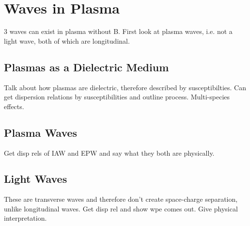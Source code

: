 \section{Waves in Plasma}%
\label{sec:theory_waves_plasmas}

3 waves can exist in plasma without B.
First look at plasma waves, i.e. not a light wave, both of which are longitudinal.

\subsection{Plasmas as a Dielectric Medium}%
\label{sec:theory_dielectric}

Talk about how plasmas are dielectric, therefore described by susceptibilties.
Can get dispersion relations by susceptibilities and outline process.
Multi-species effects.

\subsection{Plasma Waves}%
\label{sec:theory_longwaves}

Get disp rels of IAW and EPW and say what they both are physically.

\subsection{Light Waves}%
\label{sec:theory_transwaves}

These are transverse waves and therefore don't create space-charge separation, unlike longitudinal waves.
Get disp rel and show wpe comes out.
Give physical interpretation.

